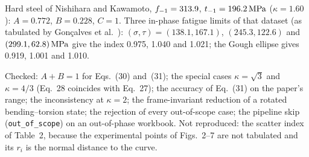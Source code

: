  Hard steel of Nishihara and Kawamoto, $f_{-1}=313.9$, $t_{-1}=196.2\,\mathrm{MPa}$
($\kappa=1.60$): $A=0.772$, $B=0.228$, $C=1$. Three in-phase fatigue limits of that dataset (as
tabulated by Gon\c{c}alves et al.\ \cite{goncalves2005}): $(\sigma,\tau)=(138.1,167.1)$,
$(245.3,122.6)$ and $(299.1,62.8)\,\mathrm{MPa}$ give the index 0.975, 1.040 and 1.021; the Gough ellipse gives
0.919, 1.001 and 1.010.

 Checked: $A+B=1$ for Eqs.~(30) and~(31); the special cases $\kappa=\sqrt3$ and
$\kappa=4/3$ (Eq.~28 coincides with Eq.~27); the accuracy of Eq.~(31) on the paper's range; the
inconsistency at $\kappa=2$; the frame-invariant reduction of a rotated bending--torsion state; the
rejection of every out-of-scope case; the pipeline skip (\texttt{out\_of\_scope}) on an out-of-phase
workbook. Not reproduced: the scatter index of Table~2, because the experimental points of
Figs.~2--7 are not tabulated and its $r_i$ is the normal distance to the curve.
